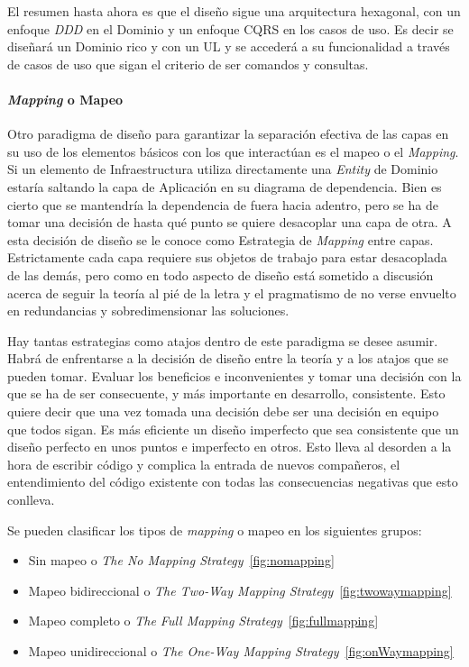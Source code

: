 El resumen hasta ahora es que el diseño sigue una arquitectura hexagonal, con un enfoque \textit{DDD} en el Dominio y un enfoque CQRS en los casos de uso.
Es decir se diseñará un Dominio rico y con un UL y se accederá a su funcionalidad a través de casos de uso que sigan el criterio de ser comandos y consultas.

\paragraph{\textit{Mapping} o Mapeo}

Otro paradigma de diseño para garantizar la separación efectiva de las capas en su uso de los elementos básicos con los que interactúan es el mapeo o el \textit{Mapping}.
Si un elemento de Infraestructura utiliza directamente una \textit{Entity} de Dominio estaría saltando la capa de Aplicación en su diagrama de dependencia.
Bien es cierto que se mantendría la dependencia de fuera hacia adentro, pero se ha de tomar una decisión de hasta qué punto se quiere desacoplar una capa de otra.
A esta decisión de diseño se le conoce como Estrategia de \textit{Mapping} entre capas.
Estrictamente cada capa requiere sus objetos de trabajo para estar desacoplada de las demás, pero como en todo aspecto de diseño está sometido a discusión acerca de seguir la teoría al pié de la letra y el pragmatismo de no verse envuelto en redundancias y sobredimensionar las soluciones.

Hay tantas estrategias como atajos dentro de este paradigma se desee asumir.
Habrá de enfrentarse a la decisión de diseño entre la teoría y a los atajos que se pueden tomar.
Evaluar los beneficios e inconvenientes y tomar una decisión con la que se ha de ser consecuente, y más importante en desarrollo, consistente.
Esto quiere decir que una vez tomada una decisión debe ser una decisión en equipo que todos sigan.
Es más eficiente un diseño imperfecto que sea consistente que un diseño perfecto en unos puntos e imperfecto en otros.
Esto lleva al desorden a la hora de escribir código y complica la entrada de nuevos compañeros, el entendimiento del código existente con todas las consecuencias negativas que esto conlleva.

Se pueden clasificar los tipos de \textit{mapping} o mapeo en los siguientes grupos\cite{TomHombergs2019GYHD}:
\begin{itemize}
    \item Sin mapeo o \textit{The No Mapping Strategy}~\cref{fig:nomapping}
    \item Mapeo bidireccional o \textit{The Two-Way Mapping Strategy}~\cref{fig:twowaymapping}
    \item Mapeo completo o \textit{The Full Mapping Strategy}~\cref{fig:fullmapping}
    \item Mapeo unidireccional o \textit{The One-Way Mapping Strategy}~\cref{fig:onWaymapping}
\end{itemize}

